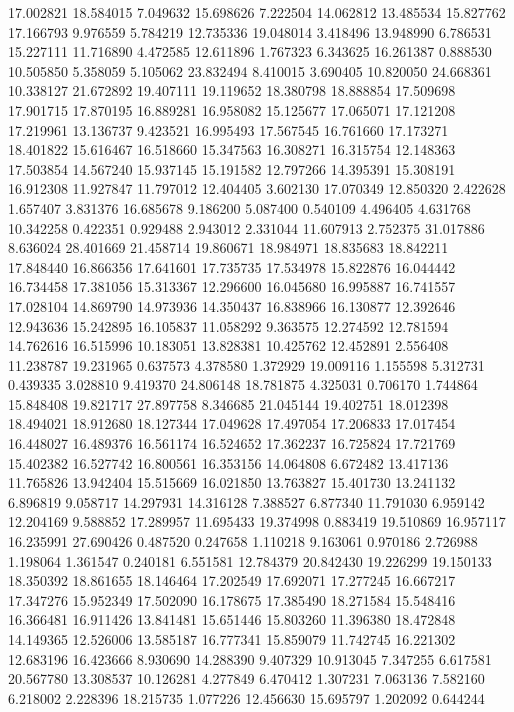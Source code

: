 17.002821
18.584015
7.049632
15.698626
7.222504
14.062812
13.485534
15.827762
17.166793
9.976559
5.784219
12.735336
19.048014
3.418496
13.948990
6.786531
15.227111
11.716890
4.472585
12.611896
1.767323
6.343625
16.261387
0.888530
10.505850
5.358059
5.105062
23.832494
8.410015
3.690405
10.820050
24.668361
10.338127
21.672892
19.407111
19.119652
18.380798
18.888854
17.509698
17.901715
17.870195
16.889281
16.958082
15.125677
17.065071
17.121208
17.219961
13.136737
9.423521
16.995493
17.567545
16.761660
17.173271
18.401822
15.616467
16.518660
15.347563
16.308271
16.315754
12.148363
17.503854
14.567240
15.937145
15.191582
12.797266
14.395391
15.308191
16.912308
11.927847
11.797012
12.404405
3.602130
17.070349
12.850320
2.422628
1.657407
3.831376
16.685678
9.186200
5.087400
0.540109
4.496405
4.631768
10.342258
0.422351
0.929488
2.943012
2.331044
11.607913
2.752375
31.017886
8.636024
28.401669
21.458714
19.860671
18.984971
18.835683
18.842211
17.848440
16.866356
17.641601
17.735735
17.534978
15.822876
16.044442
16.734458
17.381056
15.313367
12.296600
16.045680
16.995887
16.741557
17.028104
14.869790
14.973936
14.350437
16.838966
16.130877
12.392646
12.943636
15.242895
16.105837
11.058292
9.363575
12.274592
12.781594
14.762616
16.515996
10.183051
13.828381
10.425762
12.452891
2.556408
11.238787
19.231965
0.637573
4.378580
1.372929
19.009116
1.155598
5.312731
0.439335
3.028810
9.419370
24.806148
18.781875
4.325031
0.706170
1.744864
15.848408
19.821717
27.897758
8.346685
21.045144
19.402751
18.012398
18.494021
18.912680
18.127344
17.049628
17.497054
17.206833
17.017454
16.448027
16.489376
16.561174
16.524652
17.362237
16.725824
17.721769
15.402382
16.527742
16.800561
16.353156
14.064808
6.672482
13.417136
11.765826
13.942404
15.515669
16.021850
13.763827
15.401730
13.241132
6.896819
9.058717
14.297931
14.316128
7.388527
6.877340
11.791030
6.959142
12.204169
9.588852
17.289957
11.695433
19.374998
0.883419
19.510869
16.957117
16.235991
27.690426
0.487520
0.247658
1.110218
9.163061
0.970186
2.726988
1.198064
1.361547
0.240181
6.551581
12.784379
20.842430
19.226299
19.150133
18.350392
18.861655
18.146464
17.202549
17.692071
17.277245
16.667217
17.347276
15.952349
17.502090
16.178675
17.385490
18.271584
15.548416
16.366481
16.911426
13.841481
15.651446
15.803260
11.396380
18.472848
14.149365
12.526006
13.585187
16.777341
15.859079
11.742745
16.221302
12.683196
16.423666
8.930690
14.288390
9.407329
10.913045
7.347255
6.617581
20.567780
13.308537
10.126281
4.277849
6.470412
1.307231
7.063136
7.582160
6.218002
2.228396
18.215735
1.077226
12.456630
15.695797
1.202092
0.644244
